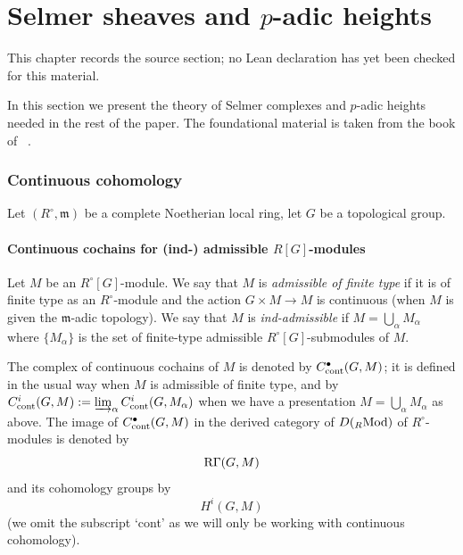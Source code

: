 \chapter{Selmer sheaves and $p$-adic heights}
\label{universal-p-adic-gross-zagier-formula-chapter-05}

\begin{remark}
\label{universal-p-adic-gross-zagier-formula-chapter-05-source}
This chapter records the source section; no Lean declaration has yet been checked for this material.
\notready
\end{remark}

\label{big sec: sel}
In this section we present the   theory of Selmer complexes and $p$-adic heights  needed in the rest of the paper. The foundational material  is  taken from the   book of \nek\  \cite{nek-selmer}.
\subsection{Continuous cohomology}
Let
  $(R^{\circ}, \mathfrak{m})$ be a complete Noetherian local ring,  let $G$ be a topological group.
  \subsubsection{Continuous cochains for (ind-) admissible $R[G]$-modules} 
Let   $M$  be an $R^{\circ}[G]$-module.
  We say that $M$ is  \emph{admissible of finite type }   if it is of finite type as an $R^{\circ}$-module  and
   the action $G\times M\to M$ is continuous  (when $M$ is given the $\mathfrak{m}$-adic topology). We say that $M$ is \emph{ind-admissible} if $M=\bigcup_{\alpha}M_{\alpha}$ where $\{M_{\alpha}\}$ is the set of   finite-type admissible $R^{\circ}[G]$-submodules of $M$.

The complex of continuous cochains of $M$ is denoted by $C^{\bullet}_{\rm cont}(G, M)$; it is defined in the usual  way \cite[(3.4.1)]{nek-selmer} when $M$ is admissible of finite type,  and by  $C^{i}_{\rm cont}(G, M):= \varinjlim_{\alpha} C^{i}_{\rm cont}(G, M_{\alpha})$ when we have a presentation $M=\bigcup_{\alpha}M_{\alpha}$ as above.   The image of  $C^{\bullet}_{\rm cont}(G, M)$ in the derived category of   $D({}_{R}{\rm Mod})$ of $R^{\circ}$-modules is denoted by
$$ {\rm R}\Gamma(G, M)$$
and its cohomology groups by $$H^{i}(G, M)$$
(we omit the subscript `cont' as we will only be working with continuous cohomology).

